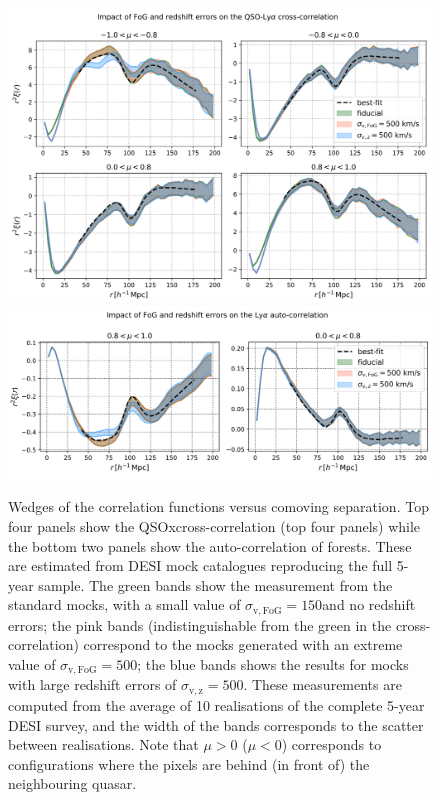 \begin{figure}[!th]
    \centering 
    \includegraphics[width=\textwidth]{fig/forests/zerrors_cross.png}
    \includegraphics[width=\textwidth]{fig/forests/zerrors_auto.png}
    \caption{Wedges of the correlation functions versus comoving separation. 
    Top four panels show the QSOx\lya cross-correlation (top four panels) 
    while the bottom two panels show the \lya auto-correlation of forests. 
    These are estimated from DESI mock catalogues reproducing the full 5-year sample. 
    The green bands show the measurement from the standard mocks, 
    with a small value of $\sigma_\mathrm{v, FoG} = 150$\kms and no redshift errors; 
    the pink bands (indistinguishable from the green in the cross-correlation) 
    correspond to the mocks generated with an extreme value of 
    $\sigma_\mathrm{v, FoG} = 500$\kms; 
    the blue bands shows the results for mocks with large redshift errors of 
    $\sigma_\mathrm{v, z}= 500$\kms. 
    These measurements are computed from the average of 10 realisations of the 
    complete 5-year DESI survey, and the width of the bands corresponds to the 
    scatter between realisations. 
    Note that $\mu > 0$ ($\mu < 0$) corresponds to configurations where 
    the \lya  pixels are behind (in front of) the neighbouring quasar.
    }
    \label{fig:zerrors_correlations}
\end{figure}

